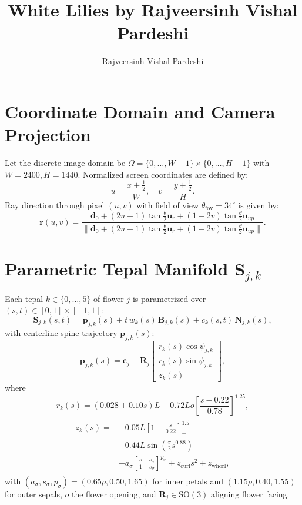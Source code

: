\documentclass[10pt,twocolumn]{article}
\title{\textbf{White Lilies by Rajveersinh Vishal Pardeshi}}
\author{Rajveersinh Vishal Pardeshi}
\date{}
\begin{document}
\maketitle

\section{Coordinate Domain and Camera Projection}
Let the discrete image domain be $\Omega = \{0, \dots, W-1\} \times \{0, \dots, H-1\}$ with $W=2400, H=1440$.
Normalized screen coordinates are defined by:
\begin{equation}
u = \frac{x + \frac{1}{2}}{W}, \quad v = \frac{y + \frac{1}{2}}{H}.
\end{equation}
Ray direction through pixel $(u, v)$ with field of view $\theta_{\mathrm{fov}} = 34^\circ$ is given by:
\begin{equation}
\mathbf{r}(u, v) = \frac{\mathbf{d}_0 + (2u - 1)\tan\frac{\theta}{2}\mathbf{u}_r + (1 - 2v)\tan\frac{\theta}{2}\mathbf{u}_{up}}{\|\mathbf{d}_0 + (2u - 1)\tan\frac{\theta}{2}\mathbf{u}_r + (1 - 2v)\tan\frac{\theta}{2}\mathbf{u}_{up}\|}.
\end{equation}

\section{Parametric Tepal Manifold $\mathbf{S}_{j,k}$}
Each tepal $k \in \{0, \dots, 5\}$ of flower $j$ is parametrized over $(s, t) \in [0, 1] \times [-1, 1]$:
\begin{equation}
\mathbf{S}_{j,k}(s, t) = \mathbf{p}_{j,k}(s) + t\,w_k(s)\,\mathbf{B}_{j,k}(s) + c_k(s, t)\,\mathbf{N}_{j,k}(s),
\end{equation}
with centerline spine trajectory $\mathbf{p}_{j,k}(s)$:
\begin{equation}
\mathbf{p}_{j,k}(s) = \mathbf{c}_j + \mathbf{R}_j \begin{bmatrix}
r_k(s) \cos\psi_{j,k} \\
r_k(s) \sin\psi_{j,k} \\
z_k(s)
\end{bmatrix},
\end{equation}
where
\begin{equation}
r_k(s) = (0.028 + 0.10 s) L + 0.72 L o \left[\frac{s - 0.22}{0.78}\right]_+^{1.25},
\end{equation}
\begin{equation}
\begin{aligned}
z_k(s) = &-0.05 L \left[1 - \frac{s}{0.22}\right]_+^{1.5} \\
&+ 0.44 L \sin\!\left(\frac{\pi}{2} s^{0.88}\right) \\
&- a_\sigma \left[\frac{s - s_\sigma}{1 - s_\sigma}\right]_+^{p_\sigma} + z_{\mathrm{curl}} s^2 + z_{\mathrm{whorl}},
\end{aligned}
\end{equation}
with $(a_\sigma, s_\sigma, p_\sigma) = (0.65\rho, 0.50, 1.65)$ for inner petals and $(1.15\rho, 0.40, 1.55)$ for outer
sepals, $o$ the flower opening, and $\mathbf{R}_j \in \mathrm{SO}(3)$ aligning flower facing.
\end{document}
